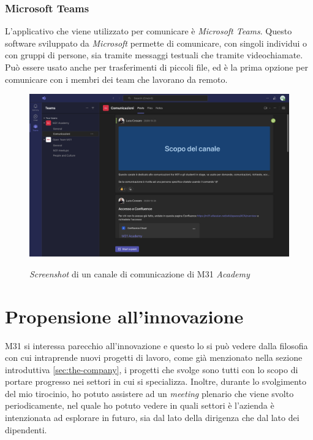 \subsubsection*{Microsoft Teams}\noindent
L'applicativo che viene utilizzato per comunicare è \textit{Microsoft Teams}. Questo software sviluppato da \textit{Microsoft} permette di comunicare, con singoli individui o con gruppi di persone, sia tramite messaggi testuali che tramite videochiamate.
Può essere usato anche per trasferimenti di piccoli file, ed è la prima opzione per comunicare con i membri dei team che lavorano da remoto.
\begin{figure}[H]
    \centering
    \includegraphics[alt={\textit{Screenshot} di un canale di comunicazione di M31 \textit{Academy}}, width=0.9\columnwidth]{img/microsoft-teams.png}
    \caption{\textit{Screenshot} di un canale di comunicazione di M31 \textit{Academy}}
    \label{fig:teams}
\end{figure}

\section{Propensione all'innovazione}\label{sec:innovation}\noindent
M31 si interessa parecchio all'innovazione e questo lo si può vedere dalla filosofia con cui intraprende nuovi progetti di lavoro, come già menzionato nella sezione introduttiva \ref{sec:the-company}, i progetti che svolge sono tutti con lo scopo di portare progresso nei settori in cui si specializza.
Inoltre, durante lo svolgimento del mio tirocinio, ho potuto assistere ad un \textit{meeting} plenario che viene svolto periodicamente, nel quale ho potuto vedere in quali settori è l'azienda è intenzionata ad esplorare in futuro, sia dal lato della dirigenza che dal lato dei dipendenti.